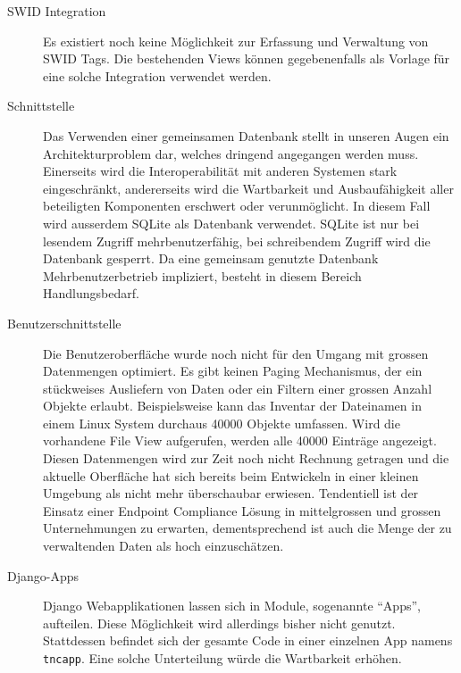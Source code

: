 \begin{description}

\item[SWID Integration] Es existiert noch keine Möglichkeit zur Erfassung und
	Verwaltung von SWID Tags. Die bestehenden Views können gegebenenfalls als
	Vorlage für eine solche Integration verwendet werden.
	
\item[Schnittstelle] Das Verwenden einer gemeinsamen Datenbank stellt in unseren
	Augen ein Architekturproblem dar, welches dringend angegangen werden muss.
	Einerseits wird die Interoperabilität mit anderen Systemen stark
	eingeschränkt, andererseits wird die Wartbarkeit und Ausbaufähigkeit aller
	beteiligten Komponenten erschwert oder verunmöglicht. In diesem Fall wird
	ausserdem SQLite als Datenbank verwendet. SQLite ist nur bei lesendem Zugriff
	mehrbenutzerfähig, bei schreibendem Zugriff wird die Datenbank gesperrt. Da
	eine gemeinsam genutzte Datenbank Mehrbenutzerbetrieb impliziert, besteht in
	diesem Bereich Handlungsbedarf.

\item[Benutzerschnittstelle] Die Benutzeroberfläche wurde noch nicht für den
	Umgang mit grossen Datenmengen optimiert. Es gibt keinen Paging Mechanismus,
	der ein stückweises Ausliefern von Daten oder ein Filtern einer grossen Anzahl
	Objekte erlaubt. Beispielsweise kann das Inventar der Dateinamen in einem
	Linux System durchaus 40000 Objekte umfassen. Wird die vorhandene File View
	aufgerufen, werden alle 40000 Einträge angezeigt.\\ Diesen Datenmengen wird
	zur Zeit noch nicht Rechnung getragen und die aktuelle Oberfläche hat sich
	bereits beim Entwickeln in einer kleinen Umgebung als nicht mehr überschaubar
	erwiesen. Tendentiell ist der Einsatz einer Endpoint Compliance Lösung in
	mittelgrossen und grossen Unternehmungen zu erwarten, dementsprechend ist auch
	die Menge der zu verwaltenden Daten als hoch einzuschätzen.

\item[Django-Apps] Django Webapplikationen lassen sich in Module, sogenannte
	\enquote{Apps}, aufteilen. Diese Möglichkeit wird allerdings bisher nicht
	genutzt. Stattdessen befindet sich der gesamte Code in einer einzelnen App
	namens \texttt{tncapp}. Eine solche Unterteilung würde die Wartbarkeit
	erhöhen.


\end{description}
